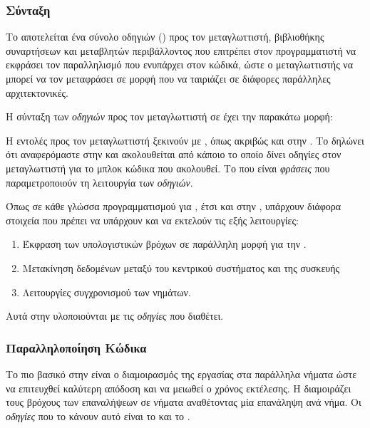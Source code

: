 \subsubsection{Σύνταξη }

Το  αποτελείται ένα σύνολο οδηγιών () προς τον μεταγλωττιστή, βιβλιοθήκης συναρτήσεων και μεταβλητών περιβάλλοντος που επιτρέπει στον προγραμματιστή να εκφράσει τον παραλληλισμό που ενυπάρχει στον κώδικά, ώστε ο μεταγλωττιστής να μπορεί να τον μεταφράσει σε μορφή που να ταιριάζει σε διάφορες παράλληλες αρχιτεκτονικές.

Η σύνταξη των \textit{οδηγιών} προς τον μεταγλωττιστή σε  έχει την παρακάτω μορφή:

\medskip
{}
\medskip

Η εντολές προς τον μεταγλωττιστή ξεκινούν με , όπως ακριβώς και στην . Το  δηλώνει ότι αναφερόμαστε στην  και ακολουθείται από κάποιο  το οποίο δίνει οδηγίες στον μεταγλωττιστή για το μπλοκ κώδικα που ακολουθεί. Το  που είναι \textit{φράσεις} που παραμετροποιούν τη λειτουργία των \textit{οδηγιών}. 

Όπως σε κάθε γλώσσα προγραμματισμού για , έτσι και στην , υπάρχουν διάφορα στοιχεία που πρέπει να υπάρχουν και να εκτελούν τις εξής λειτουργίες:

\begin{enumerate}
\item Έκφραση των υπολογιστικών βρόχων σε παράλληλη μορφή για την .
\item Μετακίνηση δεδομένων μεταξύ του κεντρικού συστήματος και της συσκευής
\item Λειτουργίες συγχρονισμού των νημάτων.
\end{enumerate}

Αυτά στην  υλοποιούνται με τις \textit{οδηγίες} που διαθέτει.

\subsubsection{Παραλληλοποίηση Κώδικα}

Το πιο βασικό στην  είναι ο διαμοιρασμός της εργασίας στα παράλληλα νήματα ώστε να επιτευχθεί καλύτερη απόδοση και να μειωθεί ο χρόνος εκτέλεσης. Η  διαμοιράζει τους βρόχους των επαναλήψεων σε νήματα αναθέτοντας μία επανάληψη ανά νήμα. Οι \textit{οδηγίες} που το κάνουν αυτό είναι το  και το . 

